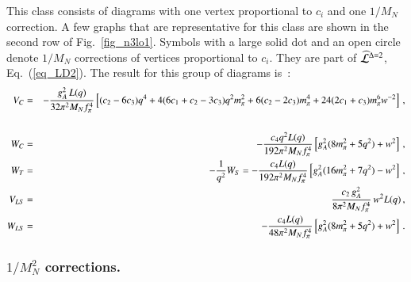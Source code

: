 \documentclass[sort&compress,preprint,3p]{elsarticle}
\begin{document}
This class consists of diagrams with one vertex proportional to $c_i$
and one $1/M_N$ correction.
A few graphs that are representative for this class are shown in the
second row of Fig.~\ref{fig_n3lo1}. 
Symbols with a large solid dot and an open circle denote 
$1/M_N$ corrections of vertices
proportional to $c_i$. They are part of
$\widehat{\cal L}^{\Delta=2}$, Eq.~(\ref{eq_LD2}).
The result for this group of diagrams is~\cite{Kai01a}:
\begin{eqnarray} 
V_C & = & - {g_A^2\, L(q) \over 32 \pi^2 M_N f_\pi^4 } \left[ 
(c_2-6c_3) q^4 +4(6c_1+c_2-3c_3)q^2 m_\pi^2 
+6(c_2-2c_3)m_\pi^4
+24(2c_1+c_3)m_\pi^6 w^{-2} \right] \,,
\nonumber \\
\label{eq_4cMC}
\\
W_C &=& 
-{c_4 q^2 L(q) \over 192 \pi^2 M_N f_\pi^4 } 
\left[ g_A^2 (8m_\pi^2+5q^2) + w^2 \right] 
\,, \\
W_T  &=&  -{1\over q^2} W_S 
     = -{c_4 L(q) \over 192 \pi^2 M_N f_\pi^4 } 
\left[ g_A^2 (16m_\pi^2+7q^2) - w^2 \right] 
\label{eq_4cMS}
\,,  \\
V_{LS}& = & {c_2 \, g_A^2 \over 8 \pi^2 M_N f_\pi^4 } 
\, w^2 L(q) 
\,, \\
W_{LS}  &=& 
-{c_4 L(q) \over 48 \pi^2 M_N f_\pi^4 } 
\left[ g_A^2 (8m_\pi^2+5q^2) + w^2 \right] 
\,.
\label{eq_4cMLS}
\end{eqnarray}


\subsubsection{$1/M_N^2$ corrections.}
\end{document}
